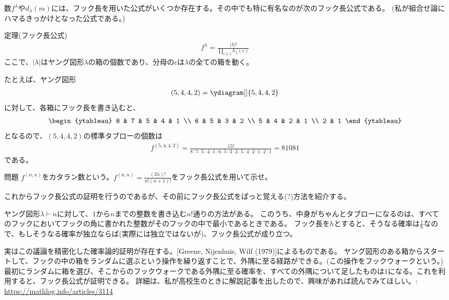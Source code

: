 \documentclass[a4paper,11pt]{jsarticle}
\theoremstyle{plain}
\theoremstyle{definition}
\renewcommand{\(}{\left(}
\renewcommand{\)}{\right)}
\renewcommand{\[}{\left[}
\renewcommand{\]}{\right]}
\renewcommand{\{}{\left\lbrace}
\renewcommand{\}}{\right\rbrace}
\begin{document}
数$f^\lambda$や$d_\lambda(m)$には、フック長を用いた公式がいくつか存在する。その中でも特に有名なのが次のフック長公式である。
(私が組合せ論にハマるきっかけとなった公式である。)

\begin{itembox}[l]{定理(フック長公式)}
    \begin{align*}  
        f^\lambda = \frac{|\lambda|!}{\displaystyle \prod_{c \in \lambda} h_{\lambda}(c)}
    \end{align*}
    ここで、$|\lambda|$はヤング図形$\lambda$の箱の個数であり、分母の$c$は$\lambda$の全ての箱を動く。
\end{itembox}

たとえば、ヤング図形
\begin{align*}
    (5,4,4,2) = \ydiagram[]{5,4,4,2}
\end{align*}
に対して、各箱にフック長を書き込むと、
\begin{align*}
    \begin{ytableau}
        8 & 7 & 5 & 4 & 1 \\
        6 & 5 & 3 & 2 \\
        5 & 4 & 2 & 1 \\
        2 & 1
    \end{ytableau}
\end{align*}
となるので、$(5,4,4,2)$の標準タブローの個数は
\begin{align*}
    f^{(5,4,4,2)} = \frac{15!}{8 \cdot 7 \cdot 5 \cdot 4 \cdot 1 \cdot 6 \cdot 5 \cdot 3 \cdot 2 \cdot 5 \cdot 4 \cdot 2 \cdot 1 \cdot 2 \cdot 1} = 81081
\end{align*}
である。

\begin{itembox}[l]{問題}
    $f^{(n,n)}$をカタラン数という。$f^{(n,n)} = \frac{(2n)!}{n!(n+1)!}$をフック長公式を用いて示せ。
\end{itembox}

これからフック長公式の証明を行うのであるが、その前にフック長公式をぱっと覚える(?)方法を紹介する。

ヤング図形$\lambda \vdash n$に対して、$1$から$n$までの整数を書き込む$n!$通りの方法がある。
このうち、中身がちゃんとタブローになるのは、すべてのフックにおいてフックの角に書かれた整数がそのフックの中で最小であるときである。
フック長を$h$とすると、そうなる確率は$\frac{1}{h}$なので、もしそうなる確率が独立ならば(実際には独立ではないが)、フック長公式が成り立つ。

実はこの議論を精密化した確率論的証明が存在する。[Greene, Nijenhuis, Wilf (1979)]によるものである。
ヤング図形のある箱からスタートして、フックの中の箱をランダムに選ぶという操作を繰り返すことで、外隅に至る経路ができる。(この操作をフックウォークという。)
最初にランダムに箱を選び、そこからのフックウォークである外隅に至る確率を、すべての外隅について足したものは$1$になる。これを利用すると、フック長公式が証明できる。
詳細は、私が高校生のときに解説記事を出したので、興味があれば読んでみてほしい。:
\url{https://mathlog.info/articles/3114}
\end{document}

